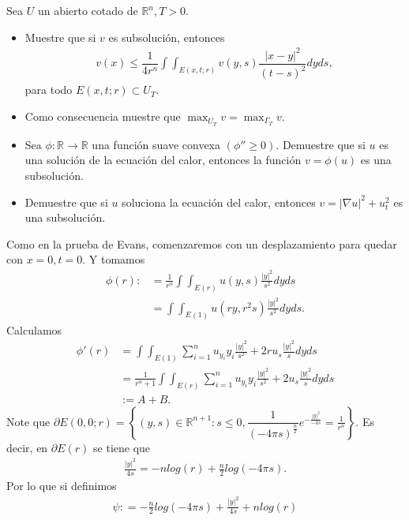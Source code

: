 \begin{homeworkProblem}
  Sea $U$ un abierto cotado de $\mathbb{R}^{n}, T>0.$
  \begin{itemize}
    \item Muestre que si $v$ es subsolución, entonces
    \begin{align*}
      v(x) \leq \dfrac{1}{4r^{n}} \int \int_{E(x,t;r)} v(y,s) \dfrac{|x-y|^{2}}{(t-s)^{2}}dyds,
    \end{align*}
    para todo $E(x,t;r) \subset U_{T}.$
    \item Como consecuencia muestre que $\max_{\overline{U_{T}}} v = \max_{\Gamma_{T}}v.$
    \item Sea $\phi : \mathbb{R} \rightarrow \mathbb{R}$ una función suave convexa $(\phi '' \geq 0).$ Demuestre que si $u$ es una solución de la ecuación del calor, entonces la función $v=\phi (u)$ es una subsolución.
    \item Demuestre que si $u$ soluciona la ecuación del calor, entonces $v = |\nabla u|^{2} + u_{t}^{2}$ es una subsolución.
  \end{itemize}
  \begin{solucion}
    Como en la prueba de Evans, comenzaremos con un desplazamiento para quedar con $x=0, t=0$. Y tomamos
    \begin{align*}
      \phi (r) :&= \frac{1}{r^{n}} \int \int_{E(r)} u(y,s) \frac{|y|^{2}}{s^{2}}dyds\\ 
                &= \int \int_{E(1)} u(ry,r^{2}s)\frac{|y|^{2}}{s^{2}}dyds.
    \end{align*}
    Calculamos
    \begin{align*}
      \phi'(r)&= \int \int_{E(1)} \sum_{i=1}^{n} u_{y_{i}}y_{i}\frac{|y|^{2}}{s^{2}} + 2ru_{s}\frac{|y|^{2}}{s} dyds\\ 
              &= \frac{1}{r^n+1} \int \int_{E(r)} \sum_{i=1}^{n} u_{y_{i}}y_{i}\frac{|y|^{2}}{s^{2}} + 2u_{s}\frac{|y|^{2}}{s} dyds\\
              &:= A+B. 
    \end{align*}
    Note que $\partial E(0,0;r) = \left\{ (y,s) \in \mathbb{R}^{n+1}: s \leq 0, \dfrac{1}{(-4\pi s)^{\frac{n}{2}}}e^{- \frac{|y|^{2}}{-4s}} = \frac{1}{r^{n}}\right\}$. Es decir, en $\partial E(r)$ se tiene que
    \begin{align*}
      \frac{|y|^{2}}{4s} = -nlog(r) + \frac{n}{2}log(-4\pi s).
    \end{align*}
    Por lo que si definimos
    \begin{align*}
      \psi : = -\frac{n}{2}log(-4\pi s) + \frac{|y|^{2}}{4s} + nlog(r)

\end{align*}
\end{solucion}
\end{homeworkProblem}
